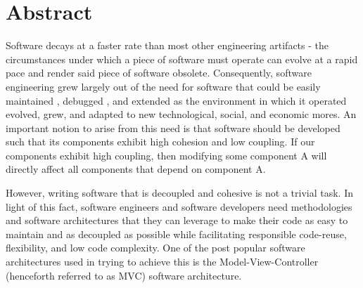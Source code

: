 \chapter*{Abstract}

Software decays at a faster rate than most other engineering artifacts - the circumstances under which a piece of software must operate can evolve at a rapid pace and render said piece of software obsolete. Consequently, software engineering grew largely out of the need for software that could be easily  maintained , debugged , and extended as the environment in which it operated evolved, grew, and adapted to new technological, social, and economic mores. An important notion to arise from this need is that software should be developed such that its components exhibit high cohesion and low coupling. If our components exhibit high coupling, then modifying some component A will directly affect all components that depend on component A.

However, writing software that is decoupled and cohesive is not a trivial task. In light of this fact, software engineers and software developers need methodologies and software architectures that they can leverage to make their code as easy to maintain and as decoupled as possible  while facilitating responsible code-reuse, flexibility, and low code complexity. One of the post popular software architectures used in trying to achieve this is the Model-View-Controller (henceforth referred to as MVC) software architecture.


